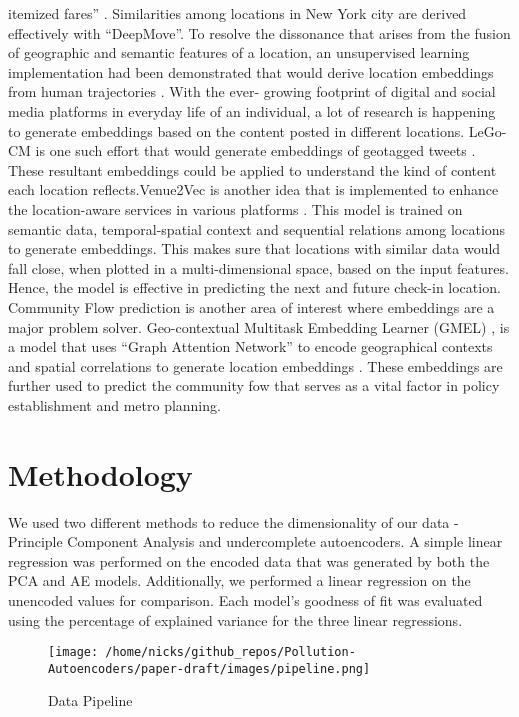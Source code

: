\documentclass{article}
\begin{document}
itemized fares” \parencite{DeepMove}. Similarities among locations in New York city are 
derived effectively with “DeepMove”. To resolve the dissonance that arises from the 
fusion of geographic and semantic features of a location, an unsupervised learning 
implementation had been demonstrated that would derive location embeddings from human 
trajectories \parencite{DisentangledLocationEmbeddings}. With the ever- growing 
footprint of digital and social media platforms in everyday life of an individual, a
lot of research is happening to generate embeddings based on the content posted in 
different locations. LeGo-CM is one such effort that would generate embeddings of 
geotagged tweets \parencite{GeotaggedTweets}. These resultant embeddings could be 
applied to understand the kind of content each location reflects.Venue2Vec is another 
idea that is implemented to enhance the location-aware services in various platforms 
\parencite{Venue2Vec}. This model is trained on semantic data, temporal-spatial context 
and sequential relations among locations to generate embeddings. This makes sure that 
locations with similar data would fall close, when plotted in a multi-dimensional space,
based on the input features. Hence, the model is effective in predicting the next and  
future check-in location. Community Flow prediction is another area of interest where
embeddings are a major problem solver. Geo-contextual Multitask Embedding Learner (GMEL)
, is a model that uses “Graph Attention Network” to encode geographical contexts and 
spatial correlations to generate location embeddings \parencite{CommutingFlowPrediction}.
These embeddings are further used to predict the community fow that serves as a vital
factor in policy establishment and metro planning.


\section{Methodology}

We used two different methods to reduce the dimensionality of our data - Principle Component
Analysis and undercomplete autoencoders. A simple linear regression was performed on 
the encoded data that was generated by both the PCA and AE models. Additionally, we performed
a linear regression on the unencoded values for comparison. Each model's goodness of fit
was evaluated using the percentage of explained variance for the three linear regressions. 

\begin{figure}[h]
\texttt{[image: /home/nicks/github\_repos/Pollution-Autoencoders/paper-draft/images/pipeline.png]}
\caption{Data Pipeline}
\label{fig:pipeline}
\end{figure}
\end{document}
